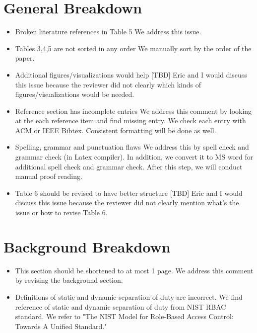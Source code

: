\pagebreak

\section{General Breakdown}

\begin{itemize}

\item Broken literature references in Table 5
We address this issue.

\item Tables 3,4,5 are not sorted in any order
We manually sort by the order of the paper.

\item Additional figures/visualizations would help
[TBD] Eric and I would discuss this issue because the reviewer did not clearly which kinds of figures/visualizations would be needed.

\item Reference section has incomplete entries
We address this comment by looking at the each reference item and find missing entry. We check each entry with ACM or IEEE Bibtex. Consistent formatting will be done as well.

\item Spelling, grammar and punctuation flaws
We address this by spell check and grammar check (in Latex compiler). In addition, we convert it to MS word for additional spell check and grammar check. After this step, we will conduct manual proof reading.

\item Table 6 should be revised to have better structure
[TBD]  Eric and I would discuss this issue because the reviewer did not clearly mention what's the issue or how to revise Table 6.

\end{itemize}


\section{Background Breakdown}

\begin{itemize}

\item This section should be shortened to at most 1 page.
We address this comment by revising the background section.

\item Definitions of static and dynamic separation of duty are incorrect.
We find reference of static and dynamic separation of duty from NIST RBAC standard. We refer to "The NIST Model for Role-Based Access Control: Towards A Unified Standard."

\end{itemize}

